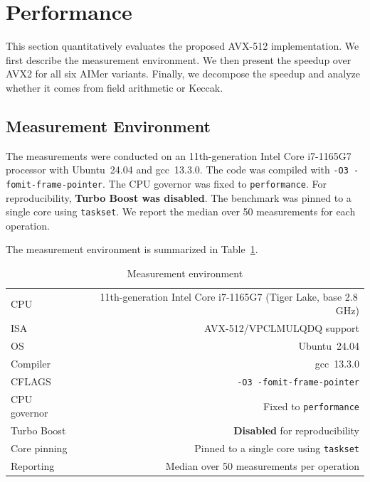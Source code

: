 \section{Performance}
\label{sec:eval}

This section quantitatively evaluates the proposed AVX-512 implementation. We first describe the measurement environment. We then present the speedup over AVX2 for all six AIMer variants. Finally, we decompose the speedup and analyze whether it comes from field arithmetic or Keccak.

\subsection{Measurement Environment}

The measurements were conducted on an 11th-generation Intel Core i7-1165G7 processor with Ubuntu~24.04 and gcc~13.3.0. The code was compiled with \texttt{-O3 -fomit-frame-pointer}. The CPU governor was fixed to \texttt{performance}. For reproducibility, \textbf{Turbo Boost was disabled}. The benchmark was pinned to a single core using \texttt{taskset}. We report the median over 50 measurements for each operation.

The measurement environment is summarized in Table~\ref{tab:bench-env}.

\begin{table}[h]
\centering
\caption{Measurement environment}
\label{tab:bench-env}
{%
\setlength{\tabcolsep}{6pt}
\renewcommand{\arraystretch}{1.12} %
\begin{tabular}{l r}
\toprule
CPU & 11th-generation Intel Core i7-1165G7 (Tiger Lake, base 2.8\,GHz) \\
ISA & AVX-512/VPCLMULQDQ support \\
OS & Ubuntu~24.04 \\
Compiler & gcc~13.3.0 \\
CFLAGS & \texttt{-O3 -fomit-frame-pointer} \\
CPU governor & Fixed to \texttt{performance} \\
Turbo Boost & \textbf{Disabled} for reproducibility \\
Core pinning & Pinned to a single core using \texttt{taskset} \\
Reporting & Median over 50 measurements per operation \\
\bottomrule
\end{tabular}
}
\end{table}

